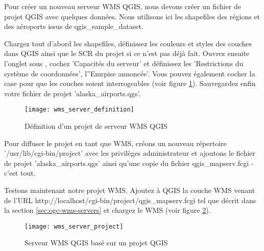 Pour créer un nouveau serveur WMS QGIS, nous devons créer un fichier de projet QGIS avec quelques données. Nous utilisons ici les shapefiles des régions et des aéroports issus de qgis\_sample\_dataset.

Chargez tout d'abord les shapefiles, définissez les couleurs et styles des couches dans QGIS ainsi que le SCR du projet si ce n'est pas déjà fait. Ouvrez ensuite l'onglet   sous  \arrow {}, cochez 'Capacités du serveur' et définissez les 'Restrictions du système de coordonnées', l''Emrpise annoncée'. Vous pouvez également cocher la case  pour que les couches soient interrogeables (voir figure \ref{fig:wmsdefinition}). Sauvegardez enfin votre fichier de projet 'alaska\_airports.qgs'.

\begin{figure}[ht]
\centering
\texttt{[image: wms\_server\_definition]}
\caption{Définition d'un projet de serveur WMS QGIS \nixcaption}
\label{fig:wmsdefinition}
\end{figure}

Pour diffuser le projet en tant que WMS, créons un nouveau répertoire '/usr/lib/cgi-bin/project' avec les privilèges administrateur et ajoutons le fichier de projet 'alaska\_airports.qgs' ainsi qu'une copie du fichier qgis\_mapserv.fcgi - c'est tout.

Testons maintenant notre projet WMS. Ajoutez à QGIS la couche WMS venant de l'URL http://localhost/cgi-bin/project/qgis\_mapserv.fcgi tel que décrit dans la section \ref{sec:ogc-wms-servers} et chargez le WMS (voir figure \ref{fig:wmsproject}).

\begin{figure}[ht]
\centering
\texttt{[image: wms\_server\_project]}
\caption{Serveur WMS QGIS basé sur un projet QGIS \nixcaption}
\label{fig:wmsproject}
\end{figure}

\FloatBarrier
